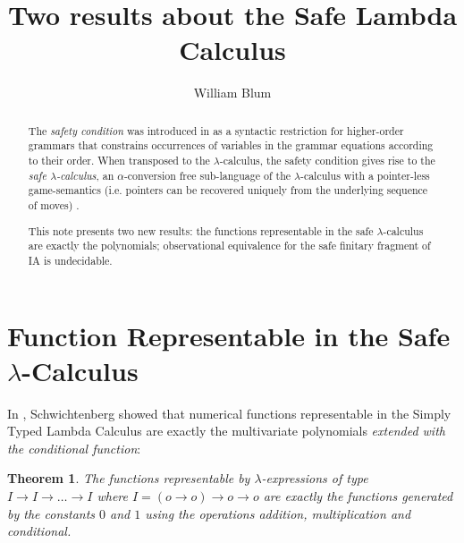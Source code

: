 \documentclass{article}
\author{William Blum}
\title{Two results about the Safe Lambda Calculus}
\newtheorem{theorem}{Theorem}[section]
\begin{document}
\maketitle

\begin{abstract}
The \emph{safety condition} was introduced in \cite{KNU02} as a syntactic restriction for higher-order grammars that constrains occurrences of variables in the grammar equations according to their order. When transposed to the $\lambda$-calculus, the safety condition gives rise to the \emph{safe $\lambda$-calculus}, an $\alpha$-conversion free sub-language of the $\lambda$-calculus with a pointer-less game-semantics (i.e. pointers can be recovered uniquely from the underlying sequence of moves) \cite{blumtransfer}.

This note presents two new results: the functions representable in the safe $\lambda$-calculus are exactly the polynomials; observational equivalence for the safe finitary fragment of IA is undecidable.
\end{abstract}

\section{Function Representable in the Safe $\lambda$-Calculus}

In \cite{citeulike:622637}, Schwichtenberg showed that 
numerical functions representable in the Simply Typed Lambda Calculus are exactly the multivariate polynomials \emph{extended with the conditional function}:
\begin{theorem}
The functions representable by $\lambda$-expressions of type $I\rightarrow I \rightarrow \ldots \rightarrow I$ where $I = (o\rightarrow o)\rightarrow o\rightarrow o$ are exactly the functions generated by the constants $0$ and $1$ using the operations addition, multiplication and conditional.
\end{theorem}
\end{document}
